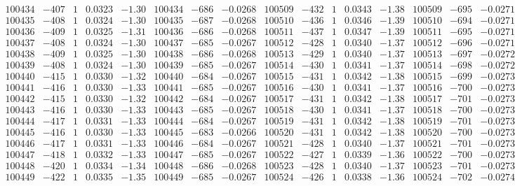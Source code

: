 \documentclass[11pt,reqno,a4letter]{article}
\numberwithin{figure}{section}
\numberwithin{table}{section}
\theoremstyle{plain}
\numberwithin{theorem}{section}
\theoremstyle{definition}
\begin{document}
\begin{table}[ht!]
\begin{equation*}
{\begin{array}{ccccc|ccc||ccccc|ccc}
100434 & -407 & 1 & 0.0323 & -1.30 & 100434 & -686 & -0.0268 & 100509 & -432 & 1 & 0.0343 & -1.38 & 100509 & -695 & -0.0271  \\
100435 & -408 & 1 & 0.0324 & -1.30 & 100435 & -687 & -0.0268 & 100510 & -436 & 1 & 0.0346 & -1.39 & 100510 & -694 & -0.0271  \\
100436 & -409 & 1 & 0.0325 & -1.31 & 100436 & -686 & -0.0268 & 100511 & -437 & 1 & 0.0347 & -1.39 & 100511 & -695 & -0.0271  \\
100437 & -408 & 1 & 0.0324 & -1.30 & 100437 & -685 & -0.0267 & 100512 & -428 & 1 & 0.0340 & -1.37 & 100512 & -696 & -0.0271  \\
100438 & -409 & 1 & 0.0325 & -1.30 & 100438 & -686 & -0.0268 & 100513 & -429 & 1 & 0.0340 & -1.37 & 100513 & -697 & -0.0272  \\
100439 & -408 & 1 & 0.0324 & -1.30 & 100439 & -685 & -0.0267 & 100514 & -430 & 1 & 0.0341 & -1.37 & 100514 & -698 & -0.0272  \\
100440 & -415 & 1 & 0.0330 & -1.32 & 100440 & -684 & -0.0267 & 100515 & -431 & 1 & 0.0342 & -1.38 & 100515 & -699 & -0.0273  \\
100441 & -416 & 1 & 0.0330 & -1.33 & 100441 & -685 & -0.0267 & 100516 & -430 & 1 & 0.0341 & -1.37 & 100516 & -700 & -0.0273  \\
100442 & -415 & 1 & 0.0330 & -1.32 & 100442 & -684 & -0.0267 & 100517 & -431 & 1 & 0.0342 & -1.38 & 100517 & -701 & -0.0273  \\
100443 & -416 & 1 & 0.0330 & -1.33 & 100443 & -685 & -0.0267 & 100518 & -430 & 1 & 0.0341 & -1.37 & 100518 & -700 & -0.0273  \\
100444 & -417 & 1 & 0.0331 & -1.33 & 100444 & -684 & -0.0267 & 100519 & -431 & 1 & 0.0342 & -1.38 & 100519 & -701 & -0.0273  \\
100445 & -416 & 1 & 0.0330 & -1.33 & 100445 & -683 & -0.0266 & 100520 & -431 & 1 & 0.0342 & -1.38 & 100520 & -700 & -0.0273  \\
100446 & -417 & 1 & 0.0331 & -1.33 & 100446 & -684 & -0.0267 & 100521 & -428 & 1 & 0.0340 & -1.37 & 100521 & -701 & -0.0273  \\
100447 & -418 & 1 & 0.0332 & -1.33 & 100447 & -685 & -0.0267 & 100522 & -427 & 1 & 0.0339 & -1.36 & 100522 & -700 & -0.0273  \\
100448 & -420 & 1 & 0.0334 & -1.34 & 100448 & -686 & -0.0268 & 100523 & -428 & 1 & 0.0340 & -1.37 & 100523 & -701 & -0.0273  \\
100449 & -422 & 1 & 0.0335 & -1.35 & 100449 & -685 & -0.0267 & 100524 & -426 & 1 & 0.0338 & -1.36 & 100524 & -702 & -0.0274  \\

\end{array}}
\end{equation*}
\end{table}
\end{document}
